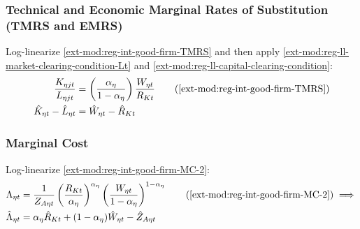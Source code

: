 \documentclass[../thesis.tex]{subfiles}
\begin{document}
\begin{comment}
	Subtract \ref{ext-mod:reg-ll-int-good-firm-FOC-Lt} from \ref{ext-mod:reg-ll-int-good-firm-FOC-Kt}:
	\begin{align}
		\hat{K}_{\eta t} - \hat{L}_{\eta t} &= \hat{Y}_{\eta t} + \hat{\Lambda}_{\eta t} - \hat{R}_{K t} - (\hat{Y}_{\eta t} + \hat{\Lambda}_{\eta t} - \hat{W}_{\eta t}) \implies \nonumber \\
		\hat{K}_{\eta t} - \hat{L}_{\eta t} &= \hat{W}_{\eta t} - \hat{R}_{K t} \label{ext-mod:reg-ll-int-good-firm-TMRS}
	\end{align}
	
	Equation \ref{ext-mod:reg-ll-int-good-firm-TMRS} is the log-linearized version of \ref{ext-mod:reg-int-good-firm-TMRS}.
	
\end{comment}

\subsubsection*{Technical and Economic Marginal Rates of Substitution (TMRS and EMRS)}

	Log-linearize \ref{ext-mod:reg-int-good-firm-TMRS} and then apply \ref{ext-mod:reg-ll-market-clearing-condition-Lt} and \ref{ext-mod:reg-ll-capital-clearing-condition}:
	\begin{align}
		\frac{K_{\eta jt}}{L_{\eta jt}} &= \left( \frac{{\alpha_{\eta}}}{1-\alpha_{\eta}} \right) \frac{W_{\eta t}}{R_{Kt}} \tag{\ref{ext-mod:reg-int-good-firm-TMRS}} \\
		\hat{K}_{\eta t} - \hat{L}_{\eta t} &= \hat{W}_{\eta t} - \hat{R}_{K t} \label{ext-mod:reg-ll-int-good-firm-TMRS}
	\end{align}

\subsubsection*{Marginal Cost}

Log-linearize \ref{ext-mod:reg-int-good-firm-MC-2}:
\begin{align}
	\Lambda_{\eta t} &= \frac{1}{Z_{A\eta t}} \left( \frac{R_{Kt}}{{\alpha_{\eta}}} \right)^{{\alpha_{\eta}}} \left( \frac{W_{\eta t}}{1-\alpha_{\eta}} \right)^{1-\alpha_{\eta}} \tag{\ref{ext-mod:reg-int-good-firm-MC-2}} \implies \\
	\hat{\Lambda}_{\eta t} &= {\alpha_{\eta}} \hat{R}_{Kt} + (1- {\alpha_{\eta}}) \hat{W}_{\eta t} - \hat{Z}_{A\eta t} \label{ext-mod:reg-ll-int-good-firm-MC-2}
\end{align}
\end{document}
